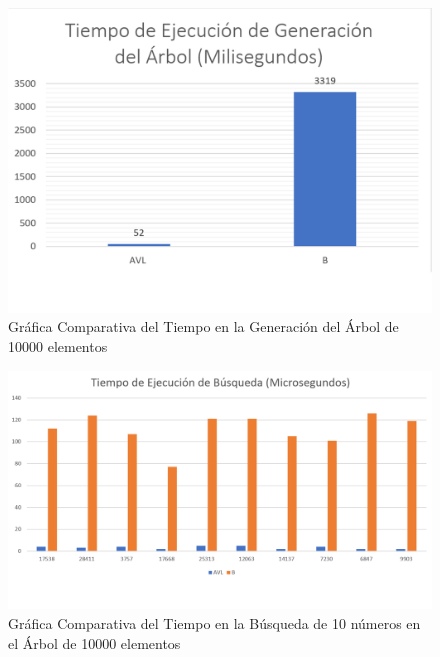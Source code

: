 \documentclass[acmsmall]{acmart}
\begin{document}
\begin{figure}[hbp]
  \centering
  \caption{Gráfica Comparativa del Tiempo en la Generación del Árbol de 10000 elementos}

  \includegraphics[angle=0,scale=0.6]{10000.1 elem.png}
  
\end{figure}
\begin{figure}[hbp]
  \centering
  \caption{Gráfica Comparativa del Tiempo en la Búsqueda de 10 números en el Árbol de 10000 elementos}

  \includegraphics[angle=0,scale=0.5]{10000.2 elem.png}
  
\end{figure}
\end{document}
